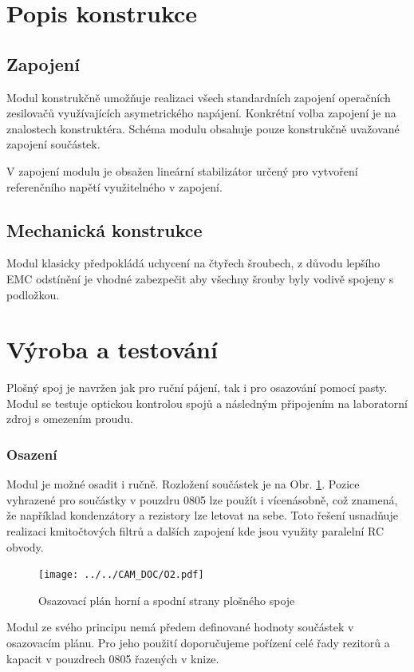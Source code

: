 \documentclass[12pt,a4paper,oneside]{article}
\begin{document}
\section{Popis konstrukce}

\subsection{Zapojení}

Modul konstrukčně umožňuje realizaci všech standardních zapojení operačních zesilovačů využívajících asymetrického napájení.  Konkrétní volba zapojení je na znalostech konstruktéra.  Schéma modulu obsahuje pouze konstrukčně uvažované zapojení součástek. 



V zapojení modulu je obsažen lineární stabilizátor určený pro vytvoření referenčního napětí využitelného v zapojení. 

\subsection{Mechanická konstrukce}

Modul klasicky předpokládá uchycení na čtyřech šroubech, z důvodu lepšího EMC odstínění je vhodné zabezpečit aby všechny šrouby byly vodivě spojeny s podložkou.  

\section{Výroba a testování}

Plošný spoj je navržen jak pro ruční pájení, tak i pro osazování pomocí pasty.  Modul se testuje optickou kontrolou spojů a následným připojením na laboratorní zdroj s omezením proudu.

\subsubsection{Osazení}

Modul je možné osadit i ručně. Rozložení součástek je na Obr. \ref{fig:osazovaci_plan}. Pozice vyhrazené pro součástky v pouzdru 0805 lze použít i vícenásobně, což znamená, že například kondenzátory a rezistory lze letovat na sebe. Toto řešení usnadňuje realizaci kmitočtových filtrů a dalších zapojení kde jsou využity paralelní RC obvody. 

\begin{figure} [h!tbp]
  \centering
  \texttt{[image: ../../CAM\_DOC/O2.pdf]}
  \caption{Osazovací plán horní a spodní strany plošného spoje}
  \label{fig:osazovaci_plan}
\end{figure}

Modul ze svého principu nemá předem definované hodnoty součástek v osazovacím plánu. Pro jeho použití doporučujeme pořízení celé řady rezitorů a kapacit v pouzdrech 0805 řazených v knize. 

\begin{thebibliography}{99}

\end{thebibliography}
\end{document}
